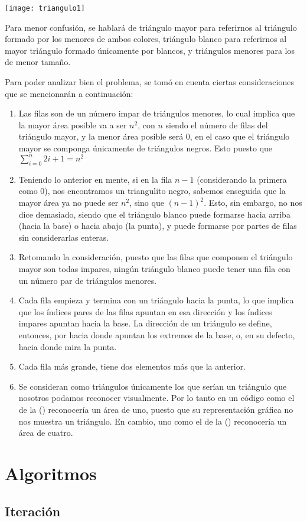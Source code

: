 \documentclass{article}
\begin{document}
    \begin{center}
      \texttt{[image: triangulo1]}
    \end{center}

  Para menor confusi\'on, se hablar\'a de tri\'angulo mayor para
  referirnos al tri\'angulo formado por los menores de ambos colores, tri\'angulo
  blanco para referirnos al mayor tri\'angulo formado \'unicamente por blancos, y
  tri\'angulos menores para los de menor tamaño.\par

  Para poder analizar bien el problema, se tom\'o en cuenta ciertas
  consideraciones que se mencionar\'an a continuaci\'on:
    \begin{enumerate}
    \item Las filas son de un n\'umero impar de tri\'angulos menores,
    lo cual implica que la mayor \'area posible va a ser \(n^2\), con \(n\) siendo el
    n\'umero de filas del tri\'angulo mayor, y la menor \'area posible ser\'a 0,
    en el caso que el tri\'angulo mayor se componga \'unicamente de tri\'angulos
    negros. Esto puesto que $\sum_{i=0}^{n} 2{i}+1 = {n}^2$
    \item Teniendo lo anterior en mente, si en la fila \(n-1\) (considerando la
    primera como 0), nos encontramos un triangulito negro, sabemos enseguida
    que la mayor \'area ya no puede ser \({n}^2\), sino que \({(n-1)}^2\). Esto, sin embargo,
    no nos dice demasiado, siendo que el tri\'angulo blanco puede formarse hacia
    arriba (hacia la base) o hacia abajo (la punta), y puede formarse por
    partes de filas sin considerarlas enteras.
    \item Retomando la consideraci\'on, puesto que las filas que componen el
    tri\'angulo mayor son todas impares, ning\'un tri\'angulo blanco puede tener
    una fila con un n\'umero par de tri\'angulos menores.
    \item Cada fila empieza y termina con un tri\'angulo hacia la punta, lo que
    implica que los \'indices pares de las filas apuntan en esa direcci\'on y
    los \'indices impares apuntan hacia la base. La direcci\'on de un tri\'angulo
    se define, entonces, por hacia donde apuntan los extremos de la base, o,
    en su defecto, hacia donde mira la punta.
    \item Cada fila m\'as grande, tiene dos elementos m\'as que la
    anterior.
    \item Se consideran como tri\'angulos \'unicamente los que ser\'ian un
    tri\'angulo que nosotros podamos reconocer visualmente. Por
    lo tanto en un c\'odigo como el de la () reconocer\'ia un
    \'area de uno, puesto que su representaci\'on gr\'afica no nos
    muestra un tri\'angulo. En cambio, uno como el de la ()
    reconocer\'ia un \'area de cuatro.
    \end{enumerate}

  \section{Algoritmos}
  \subsection{Iteraci\'on}
\end{document}
